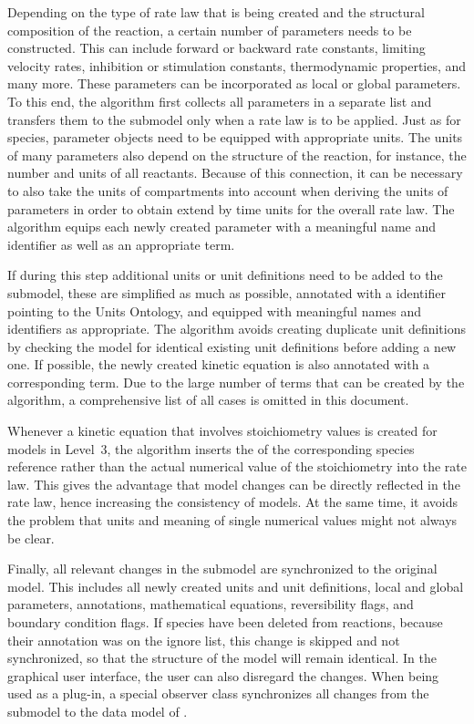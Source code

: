 Depending on the type of rate law that is being created and the structural composition of the reaction, a certain number of parameters needs to be constructed.
This can include forward or backward rate constants, limiting velocity rates, inhibition or stimulation constants, thermodynamic properties, and many more.
These parameters can be incorporated as local or global parameters.
To this end, the algorithm first collects all parameters in a separate list and transfers them to the submodel only when a rate law is to be applied.
Just as for species, parameter objects need to be equipped with appropriate units.
The units of many parameters also depend on the structure of the reaction, for instance, the number and units of all reactants.
Because of this connection, it can be necessary to also take the units of compartments into account when deriving the units of parameters in order to obtain extend by time units for the overall rate law.
The algorithm equips each newly created parameter with a meaningful name and identifier as well as an appropriate \SBO term.

If during this step additional units or unit definitions need to be added to the submodel, these are simplified as much as possible, annotated with a \MIRIAM identifier pointing to the Units Ontology, and equipped with meaningful names and identifiers as appropriate.
The algorithm avoids creating duplicate unit definitions by checking the model for identical existing unit definitions before adding a new one.
If possible, the newly created kinetic equation is also annotated with a corresponding \SBO term.
Due to the large number of \SBO terms that can be created by the algorithm, a comprehensive list of all cases is omitted in this document.

Whenever a kinetic equation that involves stoichiometry values is created for models in \SBML Level~3, the algorithm inserts the \ID of the corresponding species reference rather than the actual numerical value of the stoichiometry into the rate law.
This gives the advantage that model changes can be directly reflected in the rate law, hence increasing the consistency of models.
At the same time, it avoids the problem that units and meaning of single numerical values might not always be clear.

Finally, all relevant changes in the submodel are synchronized to the original model.
This includes all newly created units and unit definitions, local and global parameters, annotations, mathematical equations, reversibility flags, and boundary condition flags.
If species have been deleted from reactions, because their \MIRIAM annotation was on the ignore list, this change is skipped and not synchronized, so that the structure of the model will remain identical.
In the graphical user interface, the user can also disregard the changes.
When being used as a \CellDesigner plug-in, a special observer class synchronizes all changes from the submodel to the data model of \CellDesigner.

